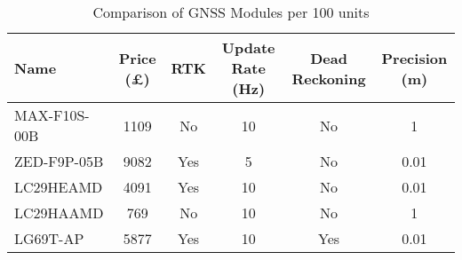 \begin{table}[h]
  \centering
  \begin{tabular}{lccccc}
    \toprule
    \textbf{Name} & \textbf{Price (£)} & \textbf{RTK} & \textbf{Update Rate (Hz)} & \textbf{Dead Reckoning} & \textbf{Precision (m)} \\
    \midrule
    MAX-F10S-00B\tablefootnote{\url{https://www.u-blox.com/en/product/max-f10s-module}} & 1109 & No  & 10 & No  & 1    \\
    ZED-F9P-05B\tablefootnote{\url{https://www.u-blox.com/en/product/zed-f9p-module}}    & 9082 & Yes & 5  & No  & 0.01 \\
    LC29HEAMD\tablefootnote{\url{www.quectel.com/content/uploads/2025/03/Quectel_Product_Brochure_V8.3.pdf}}         & 4091 & Yes & 10 & No  & 0.01 \\
    LC29HAAMD\tablefootnote{\url{www.quectel.com/content/uploads/2025/03/Quectel_Product_Brochure_V8.3.pdf}}         & 769  & No  & 10 & No  & 1    \\
    LG69T-AP\tablefootnote{\url{www.quectel.com/content/uploads/2025/03/Quectel_Product_Brochure_V8.3.pdf}}   & 5877 & Yes & 10 & Yes & 0.01 \\
    \bottomrule
  \end{tabular}
  \caption{Comparison of GNSS Modules per 100 units}
  \label{tab:gnss-modules}
\end{table}